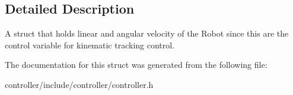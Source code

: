 \subsection{Detailed Description}
A struct that holds linear and angular velocity of the Robot since this are the control variable for kinematic tracking control. 

The documentation for this struct was generated from the following file\+:\begin{DoxyCompactItemize}
\item 
controller/include/controller/controller.\+h\end{DoxyCompactItemize}
